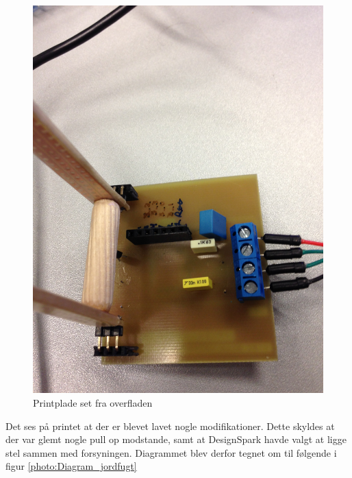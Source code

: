 \begin{figure}[H]
	\centering 
\includegraphics[scale=0.1]{HardwareArkitektur/Sensore/Jordfugt_billeder/Print_1.jpg}
	\caption{Printplade set fra overfladen}
	\label{photo:Print_1}
\end{figure} 

Det ses på printet at der er blevet lavet nogle modifikationer. Dette skyldes at der var glemt nogle pull op modstande, samt at DesignSpark havde valgt at ligge stel sammen med forsyningen. 
Diagrammet blev derfor tegnet om til følgende i figur \ref{photo:Diagram_jordfugt} 

